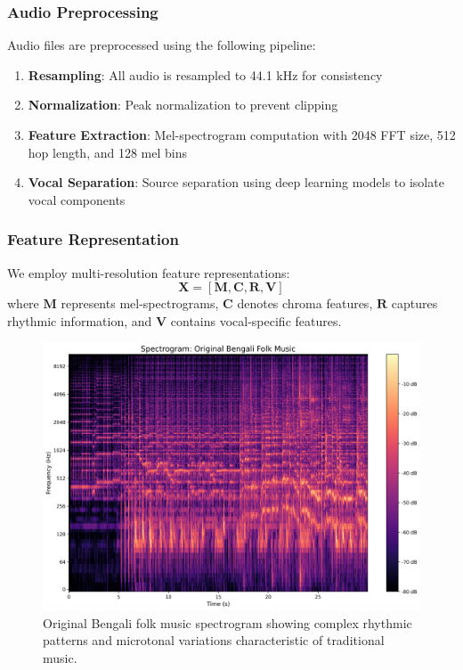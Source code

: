 \documentclass[conference]{IEEEtran}
\begin{document}
\subsubsection{Audio Preprocessing}
Audio files are preprocessed using the following pipeline:
\begin{enumerate}
\item \textbf{Resampling}: All audio is resampled to 44.1 kHz for consistency
\item \textbf{Normalization}: Peak normalization to prevent clipping
\item \textbf{Feature Extraction}: Mel-spectrogram computation with 2048 FFT size, 512 hop length, and 128 mel bins
\item \textbf{Vocal Separation}: Source separation using deep learning models to isolate vocal components
\end{enumerate}

\subsubsection{Feature Representation}
We employ multi-resolution feature representations:
\begin{equation}
\mathbf{X} = [\mathbf{M}, \mathbf{C}, \mathbf{R}, \mathbf{V}]
\label{eq:features}
\end{equation}
where $\mathbf{M}$ represents mel-spectrograms, $\mathbf{C}$ denotes chroma features, $\mathbf{R}$ captures rhythmic information, and $\mathbf{V}$ contains vocal-specific features.

\begin{figure}[!htbp]
\centering
\includegraphics[width=\columnwidth]{spectrogram_original.png}
\caption{Original Bengali folk music spectrogram showing complex rhythmic patterns and microtonal variations characteristic of traditional music.}
\label{fig:spectrogram_original}
\end{figure}
\end{document}
